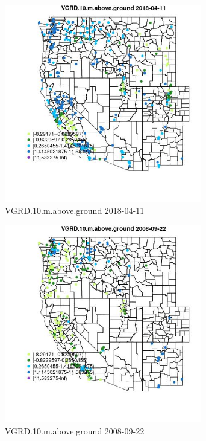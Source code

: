\begin{figure} 
\centering  
\includegraphics[width=0.77\textwidth]{Code_Outputs/Report_ML_input_PM25_Step4_part_e_de_duplicated_aves_compiled_2019-05-18wNAs_MapObsVGRD10maboveground2018-04-11.jpg} 
\caption{\label{fig:Report_ML_input_PM25_Step4_part_e_de_duplicated_aves_compiled_2019-05-18wNAsMapObsVGRD10maboveground2018-04-11}VGRD.10.m.above.ground 2018-04-11} 
\end{figure} 
 

\begin{figure} 
\centering  
\includegraphics[width=0.77\textwidth]{Code_Outputs/Report_ML_input_PM25_Step4_part_e_de_duplicated_aves_compiled_2019-05-18wNAs_MapObsVGRD10maboveground2008-09-22.jpg} 
\caption{\label{fig:Report_ML_input_PM25_Step4_part_e_de_duplicated_aves_compiled_2019-05-18wNAsMapObsVGRD10maboveground2008-09-22}VGRD.10.m.above.ground 2008-09-22} 
\end{figure} 
 

